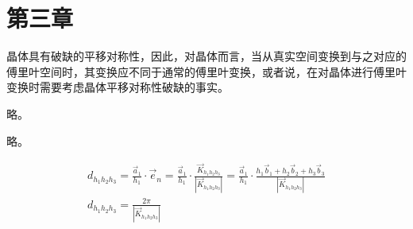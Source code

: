 \documentclass[UTF8,12pt, a4paper, oneside]{ctexart}
\begin{document}
\section{第三章}

    {晶体具有破缺的平移对称性，因此，对晶体而言，当从真实空间变换到与之对应的傅里叶空间时，其变换应不同于通常的傅里叶变换，或者说，在对晶体进行傅里叶变换时需要考虑晶体平移对称性破缺的事实。}

    {略。}

    {略。}

    {\[\begin{gathered}
     d_{h_{1} h_{2} h_{3}}=\frac{\vec{a}_{1}}{h_{1}} \cdot \vec{e}_{n}=\frac{\vec{a}_{1}}{h_{1}} \cdot \frac{\vec{K}_{h_{1} h_{2} h_{3}}}{\left|\vec{K}_{h_{1} h_{2} h_{3}}\right|}=\frac{\vec{a}_{1}}{h_{1}} \cdot \frac{h_{1} \vec{b}_{1}+h_{2} \vec{b}_{2}+h_{3} \vec{b}_{3}}{\left|\vec{K}_{h_{1} h_{2} h_{3}}\right|} \\
     d_{h_{1} h_{2} h_{3}}=\frac{2 \pi}{\left|\vec{K}_{h_{1} h_{2} h_{3}}\right|}
    \end{gathered}\]}
\end{document}
